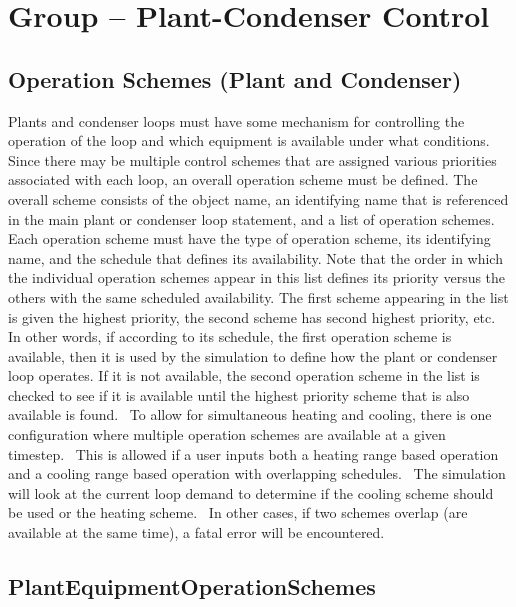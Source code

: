 \section{Group -- Plant-Condenser Control}\label{group-plant-condenser-control}

\subsection{Operation Schemes (Plant and Condenser)}\label{operation-schemes-plant-and-condenser}

Plants and condenser loops must have some mechanism for controlling the operation of the loop and which equipment is available under what conditions. Since there may be multiple control schemes that are assigned various priorities associated with each loop, an overall operation scheme must be defined. The overall scheme consists of the object name, an identifying name that is referenced in the main plant or condenser loop statement, and a list of operation schemes. Each operation scheme must have the type of operation scheme, its identifying name, and the schedule that defines its availability. Note that the order in which the individual operation schemes appear in this list defines its priority versus the others with the same scheduled availability. The first scheme appearing in the list is given the highest priority, the second scheme has second highest priority, etc. In other words, if according to its schedule, the first operation scheme is available, then it is used by the simulation to define how the plant or condenser loop operates. If it is not available, the second operation scheme in the list is checked to see if it is available until the highest priority scheme that is also available is found.~ To allow for simultaneous heating and cooling, there is one configuration where multiple operation schemes are available at a given timestep.~ This is allowed if a user inputs both a heating range based operation and a cooling range based operation with overlapping schedules.~ The simulation will look at the current loop demand to determine if the cooling scheme should be used or the heating scheme.~ In other cases, if two schemes overlap (are available at the same time), a fatal error will be encountered.

\subsection{PlantEquipmentOperationSchemes}\label{plantequipmentoperationschemes}

